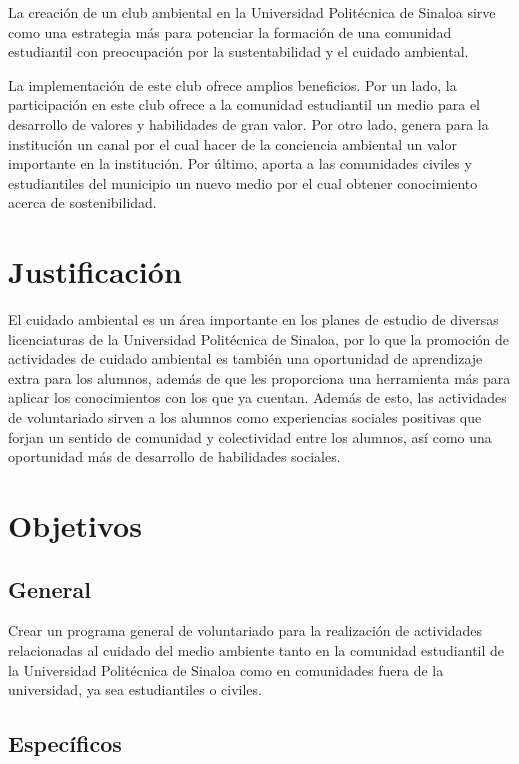 
La creación de un club ambiental en la Universidad Politécnica de Sinaloa sirve como una estrategia más para potenciar la formación de una comunidad estudiantil con preocupación por la sustentabilidad y el cuidado ambiental. 

La implementación de este club ofrece amplios beneficios. Por un lado, la participación en este club ofrece a la comunidad estudiantil un medio para el desarrollo de valores y habilidades de gran valor. Por otro lado, genera para la institución un canal por el cual hacer de la conciencia ambiental un valor importante en la institución. Por último, aporta  a las comunidades civiles y estudiantiles del municipio  un nuevo medio por el cual obtener conocimiento acerca de sostenibilidad.

\section{Justificación}

El cuidado ambiental es un área importante en los planes de estudio de diversas licenciaturas de la Universidad Politécnica de Sinaloa, por lo que la promoción de actividades de cuidado ambiental es también una oportunidad de aprendizaje extra para los alumnos, además de que les proporciona una herramienta más para aplicar los conocimientos con los que ya cuentan. Además de esto, las actividades de voluntariado sirven a los alumnos como experiencias sociales positivas que forjan un sentido de comunidad y colectividad entre los alumnos, así como una oportunidad más de desarrollo de habilidades sociales.

\section{Objetivos}

\subsection{General}

Crear un programa general de voluntariado para la realización de actividades relacionadas al cuidado del medio ambiente tanto en la comunidad estudiantil de la Universidad Politécnica de Sinaloa como en comunidades fuera de la universidad, ya sea estudiantiles o civiles.

\subsection{Específicos}

